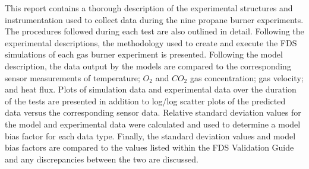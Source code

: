 This report contains a thorough description of the experimental structures and instrumentation used to collect data during the nine propane burner experiments. The procedures followed during each test are also outlined in detail. Following the experimental descriptions, the methodology used to create and execute the FDS simulations of each gas burner experiment is presented. Following the model description, the data output by the models are compared to the corresponding sensor measurements of temperature; $O_2$ and $CO_2$ gas concentration; gas velocity; and heat flux. Plots of simulation data and experimental data over the duration of the tests are presented in addition to log/log scatter plots of the predicted data versus the corresponding sensor data. Relative standard deviation values for the model and experimental data were calculated and used to determine a model bias factor for each data type. Finally, the standard deviation values and model bias factors are compared to the values listed within the FDS Validation Guide and any discrepancies between the two are discussed. 